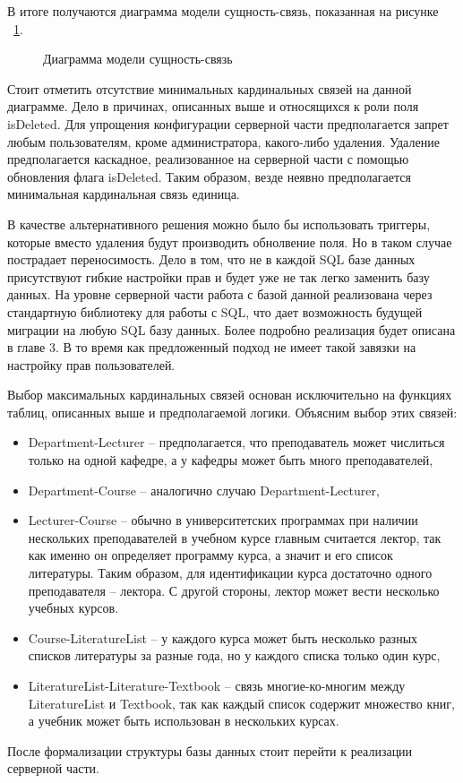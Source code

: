 В итоге получаются диаграмма модели сущность-связь, показанная на рисунке ~\ref{ris:ermodel}.

\begin{figure}[h!]
    \caption{Диаграмма модели сущность-связь}
    \label{ris:ermodel}
\end{figure}

Стоит отметить отсутствие минимальных кардинальных связей на данной диаграмме. Дело в причинах, описанных выше и 
относящихся к роли поля isDeleted. Для упрощения конфигурации серверной части предполагается запрет любым пользователям,
кроме администратора, какого-либо удаления. Удаление предполагается каскадное, реализованное на серверной части
с помощью обновления флага isDeleted. Таким образом, везде неявно предполагается минимальная кардинальная связь единица.

В качестве альтернативного решения можно было бы использовать триггеры, которые вместо удаления будут
производить обнолвение поля. Но в таком случае пострадает переносимость. Дело в том, что не в каждой
SQL базе данных присутствуют гибкие настройки прав и будет уже не так легко заменить базу данных.
На уровне серверной части работа с базой данной реализована через стандартную библиотеку для работы с
SQL, что дает возможность будущей миграции на любую SQL базу данных. Более подробно реализация будет описана в главе 3.
В то время как предложенный подход не имеет такой завязки на настройку прав пользователей.

Выбор максимальных кардинальных связей основан исключительно на функциях таблиц, описанных выше и предполагаемой
логики. Объясним выбор этих связей:

\begin{itemize}
    \item Department-Lecturer -- предполагается, что преподаватель может числиться только на одной кафедре, а у кафедры 
    может быть много преподавателей,
    \item Department-Course -- аналогично случаю Department-Lecturer,
    \item Lecturer-Course -- обычно в университетских программах при наличии нескольких преподавателей в учебном
    курсе главным считается лектор, так как именно он определяет программу курса, а значит и его список литературы. 
    Таким образом, для идентификации курса достаточно одного преподавателя -- лектора. С другой стороны, лектор может
    вести несколько учебных курсов.
    \item Course-LiteratureList -- у каждого курса может быть несколько разных списков литературы за разные года, но
    у каждого списка только один курс,
    \item LiteratureList-Literature-Textbook -- связь многие-ко-многим между LiteratureList и Textbook, так как
    каждый список содержит множество книг, а учебник может быть использован в нескольких курсах.
\end{itemize}

После формализации структуры базы данных стоит перейти к реализации серверной части.